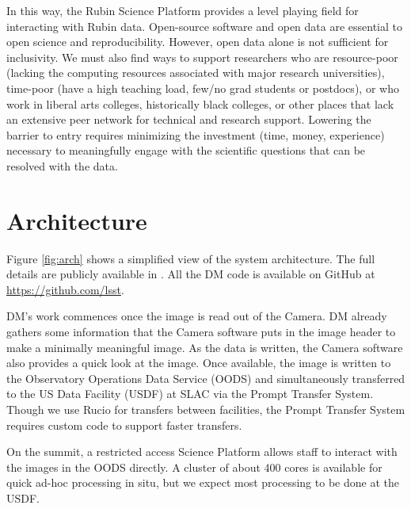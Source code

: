 \documentclass[11pt,twoside]{article}
\begin{document}
In this way, the Rubin Science Platform provides a level playing field for interacting with Rubin data.
Open-source software and open data are essential to open science and reproducibility. However, open data alone is not sufficient for inclusivity.
We must also find ways to support researchers who are resource-poor (lacking the computing resources associated with major research universities), time-poor (have a high teaching load, few/no grad students or postdocs), or who work in liberal arts colleges, historically black colleges, or other places that lack an extensive peer network for technical and research support.
Lowering the barrier to entry requires minimizing the investment (time, money, experience) necessary to meaningfully engage with the scientific questions that can be resolved with the data.

\section{Architecture}

Figure \ref{fig:arch} shows a simplified view of the system architecture. The full details are publicly available in \citep{LDM-148}. All the DM code is available on GitHub at \url{https://github.com/lsst}.

\begin{centering}
\end{centering}

DM's work commences once the image is read out of the Camera. DM already gathers some information that the Camera software puts in the image header to make a minimally meaningful image.
As the data is written, the Camera software also provides a quick look at the image.
Once available, the image is written to the Observatory Operations Data Service (OODS) and simultaneously transferred to the US Data Facility (USDF) at SLAC via the Prompt Transfer System. Though we use Rucio for transfers between facilities, the Prompt Transfer System requires custom code to support faster transfers.

On the summit, a restricted access Science Platform allows staff to interact with the images in the OODS directly.
A cluster of about 400 cores is available for quick ad-hoc processing in situ, but we expect most processing to be done at the USDF.
\end{document}
